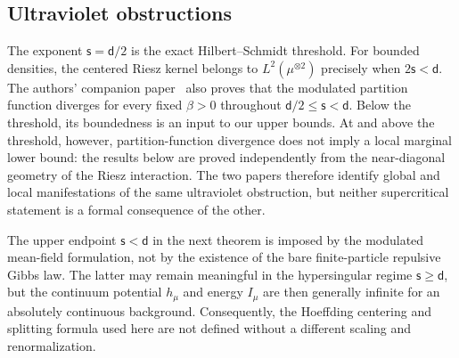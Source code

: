 \documentclass[11pt,reqno]{amsart}
\numberwithin{equation}{section}
\theoremstyle{plain}
\theoremstyle{remark}
\renewcommand{\d}{\mathsf{d}}
\newcommand{\be}{\beta}
\newcommand{\s}{\mathsf{s}}
\begin{document}
\subsection{Ultraviolet obstructions}
\label{subsec:main-ultraviolet-obstructions}

The exponent \(\s=\d/2\) is the exact Hilbert--Schmidt threshold.  For bounded densities, the centered Riesz kernel belongs to \(L^2(\mu^{\otimes2})\) precisely when \(2\s<\d\).  The authors' companion paper~\cite[Proposition~5.10]{DGR26} also proves that the modulated partition function diverges for every fixed \(\be>0\) throughout \(\d/2\le\s<\d\).  Below the threshold, its boundedness is an input to our upper bounds.  At and above the threshold, however, partition-function divergence does not imply a local marginal lower bound: the results below are proved independently from the near-diagonal geometry of the Riesz interaction.  The two papers therefore identify global and local manifestations of the same ultraviolet obstruction, but neither supercritical statement is a formal consequence of the other.

The upper endpoint \(\s<\d\) in the next theorem is imposed by the modulated mean-field formulation, not by the existence of the bare finite-particle repulsive Gibbs law.  The latter may remain meaningful in the hypersingular regime \(\s\ge\d\), but the continuum potential \(h_\mu\) and energy \(I_\mu\) are then generally infinite for an absolutely continuous background.  Consequently, the Hoeffding centering and splitting formula used here are not defined without a different scaling and renormalization.
\end{document}
